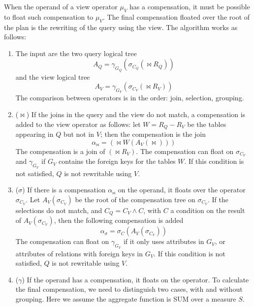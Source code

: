 When the operand of a view operator $\mu_V$ has a compensation, it must be possible to float such compensation to $\mu_V$.
The final compensation floated over the root of the plan is the rewriting of the query using the view. The algorithm works as follows:
\begin{enumerate}[noitemsep]
    \item The input are the two query logical tree
    \begin{equation*}
        A_Q = \gamma_{G_Q}(\sigma_{C_Q}(\bowtie R_Q))
    \end{equation*}
    and the view logical tree
    \begin{equation*}
        A_V = \gamma_{G_V}(\sigma_{C_V}(\bowtie R_V))
    \end{equation*}
    The comparison between operators is in the order: join, selection, grouping.
    \item ($\bowtie$) If the joins in the query and the view do not match, a compensation is added to the view operator as follows: let $W = R_Q - R_V$ be the tables appearing in $Q$ but not in $V$; then the compensation is the join
    \begin{equation*}
        \alpha_{\bowtie} = (\bowtie W (A_V(\bowtie)))
    \end{equation*}
    The compensation is a join of $(\bowtie R_V)$. The compensation can float on $\sigma_{C_V}$ and $\gamma_{G_V}$ if $G_V$ contains the foreign keys for the tables $W$. If this condition is not satisfied, $Q$ is not rewritable using $V$.
    \item ($\sigma$) If there is a compensation $\alpha_{\bowtie}$ on the operand, it floats over the operator $\sigma_{C_V}$. Let $A_V(\sigma_{C_V})$ be the root of the compensation tree on $\sigma_{C_V}$. If the selections do not match, and $C_Q = C_V \land C$, with $C$ a condition on the result of $A_V(\sigma_{C_V})$, then the following compensation is added
    \begin{equation*}
        \alpha_{\sigma} = \sigma_C(A_V(\sigma_{C_V}))
    \end{equation*}
    The compensation can float on $\gamma_{G_V}$ if it only uses attributes in $G_V$, or attributes of relations with foreign keys in $G_V$. If this condition is not satisfied, $Q$ is not rewritable using $V$.
    \item ($\gamma$) If the operand has a compensation, it floats on the operator. To calculate the final compensation, we need to distinguish two cases, with and without grouping. Here we assume the aggregate function is SUM over a measure $S$.

\end{enumerate}
